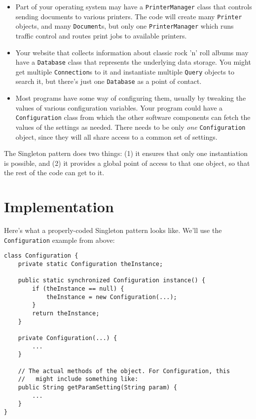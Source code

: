 \begin{itemize}
\itemsep.1em

\item Part of your operating system may have a \texttt{PrinterManager} class
that controls sending documents to various printers. The code will create many 
\texttt{Printer} objects, and many \texttt{Document}s, but only one
\texttt{PrinterManager} which runs traffic control and routes print jobs to
available printers.

\item Your website that collects information about classic rock 'n' roll
albums may have a \texttt{Database} class that represents the underlying data
storage. You might get multiple \texttt{Connection}s to it and instantiate
multiple \texttt{Query} objects to search it, but there's just one
\texttt{Database} as a point of contact.

\item Most programs have some way of configuring them, usually by tweaking the
values of various configuration variables. Your program could have a
\texttt{Config\-uration} class from which the other software components can
fetch the values of the settings as needed. There needs to be only
\textit{one} \texttt{Configuration} object, since they will all share access
to a common set of settings.

\end{itemize}

The Singleton pattern does two things: (1) it ensures that only one
instantiation is possible, and (2) it provides a global point of access to
that one object, so that the rest of the code can get to it.

\section{Implementation}

Here's what a properly-coded Singleton pattern looks like. We'll use the
\texttt{Configuration} example from above:

\begin{Verbatim}[fontsize=\small,samepage=true,frame=single]
class Configuration {
    private static Configuration theInstance;
    
    public static synchronized Configuration instance() {
        if (theInstance == null) {
            theInstance = new Configuration(...);
        }
        return theInstance;
    }

    private Configuration(...) {
        ...
    }

    // The actual methods of the object. For Configuration, this
    //   might include something like:
    public String getParamSetting(String param) {
        ...
    }
}
\end{Verbatim}


